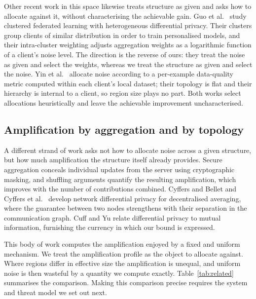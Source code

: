 \documentclass[acmsmall,screen,review,anonymous]{acmart}
\theoremstyle{acmdefinition}%
\begin{document}
Other recent work in this space likewise treats structure as given and asks how to allocate against it, without characterising the achievable gain. Guo et al.~\cite{guo2025fedcdp} study clustered federated learning with
heterogeneous differential privacy. Their clusters group clients of similar
distribution in order to train personalised models, and their intra-cluster
weighting adjusts aggregation weights as a logarithmic function of a client's
noise level. The direction is the reverse of ours: they treat the noise as given
and select the weights, whereas we treat the structure as given and select the
noise. Yin et al.~\cite{yin2026hdpfedcd} allocate noise according to a per-example
data-quality metric computed within each client's local dataset; their topology is
flat and their hierarchy is internal to a client, so region size plays no part.
Both works select allocations heuristically and leave the achievable improvement
uncharacterised.

\subsection{Amplification by aggregation and by topology}

A different strand of work asks not how to allocate noise across a given structure, but how much amplification the structure itself already provides. Secure aggregation \cite{bonawitz2017secagg} conceals individual updates from the
server using cryptographic masking, and shuffling arguments quantify the resulting
amplification, which improves with the number of contributions combined. Cyffers
and Bellet \cite{cyffers2022amplification} and Cyffers et
al.~\cite{cyffers2022muffliato} develop network differential privacy for
decentralised averaging, where the guarantee between two nodes strengthens with
their separation in the communication graph. Cuff and Yu \cite{cuff2016mi} relate
differential privacy to mutual information, furnishing the currency in which our
bound is expressed.

This body of work computes the amplification enjoyed by a fixed and uniform
mechanism. We treat the amplification profile as the object to allocate against.
Where regions differ in effective size the amplification is unequal, and uniform
noise is then wasteful by a quantity we compute exactly.
Table~\ref{tab:related} summarises the comparison. Making this comparison precise
requires the system and threat model we set out next.
\end{document}
